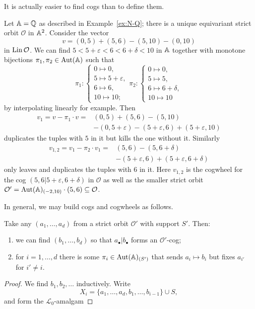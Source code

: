 It is actually easier to find cogs than to define them.
\begin{example}
    Let $\mathbb{A} = \mathbb{Q}$ as described in Example~\ref{ex:N-Q};
    there is a unique equivariant strict orbit $\mathcal{O}$ in $\mathbb{A}^2$.
    Consider the vector
    \[
        v = (0, 5) + (5, 6) - (5, 10) - (0, 10)
    \]
    in $\operatorname{Lin} \mathcal{O}$.
    We can find $5 < 5+\varepsilon < 6 < 6+\delta < 10$ in $\mathbb{A}$
    together with monotone bijections $\pi_1, \pi_2 \in \operatorname{Aut}(\mathbb{A})$ such that
    \[
        \pi_1 : 
        \begin{cases}
            0 \mapsto 0, \\
            5 \mapsto 5 + \varepsilon, \\
            6 \mapsto 6, \\
            10 \mapsto 10;
        \end{cases}
        \pi_2 : 
        \begin{cases}
            0 \mapsto 0, \\
            5 \mapsto 5, \\
            6 \mapsto 6 + \delta, \\
            10 \mapsto 10
        \end{cases}        
    \]
    by interpolating linearly for example.
    Then
    \begin{align*}
        v_1 
        = v - \pi_1 \cdot v
        ={}& (0, 5) + (5, 6) - (5, 10) \\
        &-(0, 5+\varepsilon) - (5+\varepsilon, 6) + (5+\varepsilon, 10)
    \end{align*}
    duplicates the tuples with $5$ in it but kills the one without it.
    Similarly 
    \begin{align*}
        v_{1,2}
        = v_1 - \pi_2 \cdot v_1
        ={}& (5, 6) - (5, 6+\delta) \\
        &-(5+\varepsilon, 6) + (5+\varepsilon, 6+\delta)
    \end{align*}
    only leaves and duplicates the tuples with $6$ in it.
    Here $v_{1,2}$ is the cogwheel for the cog $(5, 6|5 + \varepsilon, 6 + \delta)$ in $\mathcal{O}$
    as well as the smaller strict orbit $\mathcal{O}' = \operatorname{Aut}(\mathbb{A})_{(-2, 10)} \cdot (5, 6) \subseteq \mathcal{O}$.
\end{example}

In general, we may build cogs and cogwheels as follows.
\begin{lemma}\label{lem:finding-cogs}
    Take any $(a_1, \ldots, a_d)$ from a strict orbit $\mathcal{O}'$ with support $S'$.
    Then: 
    \begin{enumerate}
        \item 
        we can find $(b_1, \ldots, b_d)$ so that $a_\bullet | b_\bullet$ forms an $\mathcal{O}'$-cog;
        
        \item 
        for $i = 1, \ldots, d$ there is some $\pi_i \in \operatorname{Aut}(\mathbb{A})_{(S')}$ that sends $a_i \mapsto b_i$ but fixes $a_{i'}$ for $i' \neq i$. 
    \end{enumerate}
\end{lemma}

\begin{proof}
    We find $b_1, b_2, \ldots$ inductively.
    Write
    \[
        X_i = \{a_1, \ldots, a_d, b_1, \ldots, b_{i-1}\} \cup S,
    \]
    and form the $\mathcal{L}_0$-amalgam 
\end{proof}

